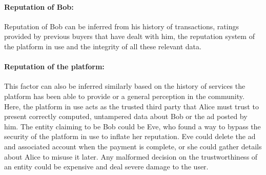 \paragraph{Reputation of Bob:} Reputation of Bob can be inferred from his
history of transactions, ratings provided by previous buyers that have dealt
with him, the reputation system of the platform in use and the integrity of all
these relevant data.  
\paragraph{Reputation of the platform:} This factor can also be inferred
similarly based on the history of services the platform has been able to
provide or a general perception in the community. Here, the platform in use
acts as the trusted third party that Alice must trust to present correctly
computed, untampered data about Bob or the ad posted by him. The entity
claiming to be Bob could be Eve, who found a way to bypass the security of the
platform in use to inflate her reputation. Eve could delete the ad and
associated account when the payment is complete, or she could gather details
about Alice to misuse it later. Any malformed decision on the trustworthiness
of an entity could be expensive and deal severe damage to the user. \par

